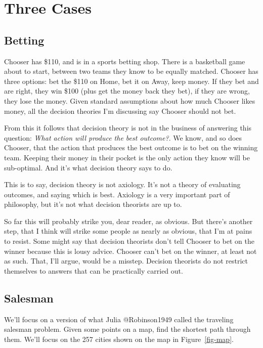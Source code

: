 \documentclass[
  letterpaper,
  DIV=11,
  numbers=noendperiod]{scrartcl}
\begin{document}
\section{Three Cases}\label{three-cases}

\subsection{Betting}\label{betting}

Chooser has \$110, and is in a sports betting shop. There is a
basketball game about to start, between two teams they know to be
equally matched. Chooser has three options: bet the \$110 on Home, bet
it on Away, keep money. If they bet and are right, they win \$100 (plus
get the money back they bet), if they are wrong, they lose the money.
Given standard assumptions about how much Chooser likes money, all the
decision theories I'm discussing say Chooser should not bet.

From this it follows that decision theory is not in the business of
answering this question: \emph{What action will produce the best
outcome?}. We know, and so does Chooser, that the action that produces
the best outcome is to bet on the winning team. Keeping their money in
their pocket is the only action they know will be sub-optimal. And it's
what decision theory says to do.

This is to say, decision theory is not axiology. It's not a theory of
evaluating outcomes, and saying which is best. Axiology is a very
important part of philosophy, but it's not what decision theorists are
up to.

So far this will probably strike you, dear reader, as obvious. But
there's another step, that I think will strike some people as nearly as
obvious, that I'm at pains to resist. Some might say that decision
theorists don't tell Chooser to bet on the winner because this is lousy
advice. Chooser can't bet on the winner, at least not as such. That,
I'll argue, would be a misstep. Decision theorists do not restrict
themselves to answers that can be practically carried out.

\subsection{Salesman}\label{salesman}

We'll focus on a version of what Julia @Robinson1949 called the
traveling salesman problem. Given some points on a map, find the
shortest path through them. We'll focus on the 257 cities shown on the
map in Figure~\ref{fig-map}.
\end{document}
